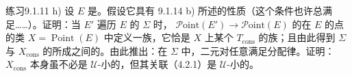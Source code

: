 \begin{SGAresult}{练习}{9.1.11}
h) 设 $E$ 是。假设它具有 9.1.14 b) 所述的性质（这个条件也许总满足……）。证明：当 $E'$ 遍历 $E$ 的 $\Sigma$ 时， $\mathscr{P}\mathrm{oint}(E')\to\mathscr{P}\mathrm{oint}(E)$ 的在 $E$ 的点的类 $X=\operatorname{Point}(E)$ 中定义一族，它恰是 $X$ 上某个 $T_{\mathrm{cons}}$ 的族；且由此得到 $\Sigma$ 与 $X_{\mathrm{cons}}$ 的所成之间的。由此推出：在 $\Sigma$ 中，二元对任意满足分配律。证明：$X_{\mathrm{cons}}$ 本身虽不必是 $\mathcal U$-小的，但其关联（4.2.1）是 $\mathcal U$-小的。
\end{SGAresult}
